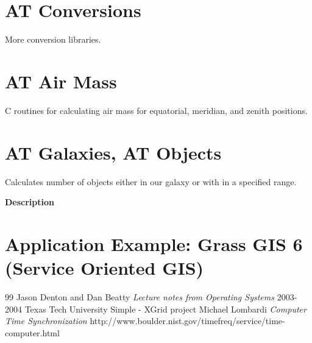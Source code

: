 \documentclass[11pt]{article}
\begin{document}
\section {AT Conversions}  
More conversion libraries.

\section {AT Air Mass}  
C routines for calculating air mass for equatorial, meridian, and zenith positions.  

\section {AT Galaxies, AT Objects}
Calculates number of objects either in our galaxy or with in a specified range.  

\textbf{Description} 

 \section {Application Example: Grass GIS 6 (Service Oriented GIS)}
 
 
 \begin {thebibliography}{99}
  Jason Denton and Dan Beatty  \textsl{Lecture notes from Operating Systems} 2003-2004 Texas Tech University
  Simple - XGrid project 
 Michael Lombardi \textsl {Computer Time Synchronization}  http://www.boulder.nist.gov/timefreq/service/time-computer.html
 \end{thebibliography}
 
  
\end{document}
